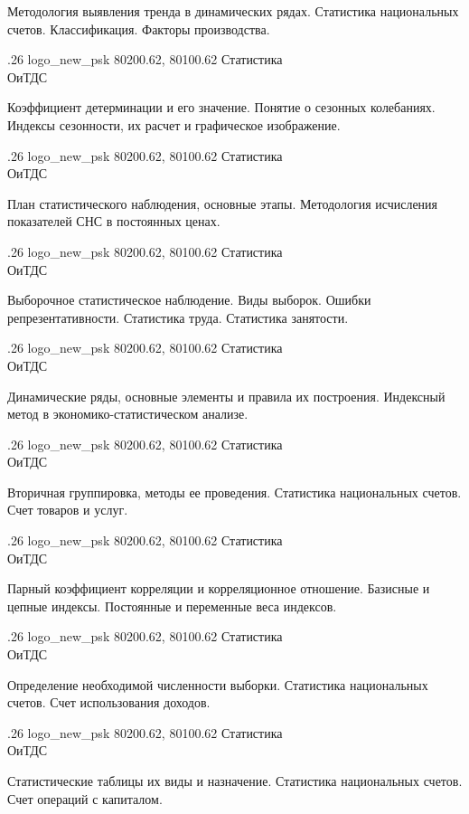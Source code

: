 \documentclass[
	12pt,
	a4paper,
	]
	{article}
\newcommand{\shapkFull}{
	\shapk
		{.26}
		{logo_new_psk}
		{80200.62, 80100.62}
		{Статистика\\}
		{ОиТДС}
		{}
}
\begin{document}
\z Методология выявления тренда в динамических рядах.
 \medskip
\z Статистика национальных счетов. Классификация. Факторы производства.
 \medskip

\newpage


\shapkFull
\setcounter{zad}{0}

\z Коэффициент детерминации и его значение.
 \medskip
\z Понятие о сезонных колебаниях. Индексы сезонности, их расчет и графическое изображение.
 \medskip

\newpage


\shapkFull
\setcounter{zad}{0}

\z План статистического наблюдения, основные этапы.
 \medskip
\z Методология исчисления показателей СНС в постоянных ценах.
 \medskip

\newpage


\shapkFull
\setcounter{zad}{0}

\z Выборочное статистическое наблюдение. Виды выборок. Ошибки репрезентативности.
 \medskip
\z Статистика труда. Статистика занятости.
 \medskip

\newpage


\shapkFull
\setcounter{zad}{0}

\z Динамические ряды, основные элементы и правила их построения.
 \medskip
\z Индексный метод в экономико-статистическом анализе.
 \medskip

\newpage


\shapkFull
\setcounter{zad}{0}

\z Вторичная группировка, методы ее проведения.
 \medskip
\z Статистика национальных счетов. Счет товаров и услуг.
 \medskip

\newpage


\shapkFull
\setcounter{zad}{0}

\z Парный коэффициент корреляции и корреляционное отношение.
 \medskip
\z Базисные и цепные индексы. Постоянные и переменные веса индексов.
 \medskip

\newpage


\shapkFull
\setcounter{zad}{0}

\z Определение необходимой численности выборки.
 \medskip
\z Статистика национальных счетов. Счет использования доходов.
 \medskip

\newpage


\shapkFull
\setcounter{zad}{0}

\z Статистические таблицы их виды и назначение.
 \medskip
\z Статистика национальных счетов. Счет операций с капиталом.
 \medskip

\newpage
\end{document}
